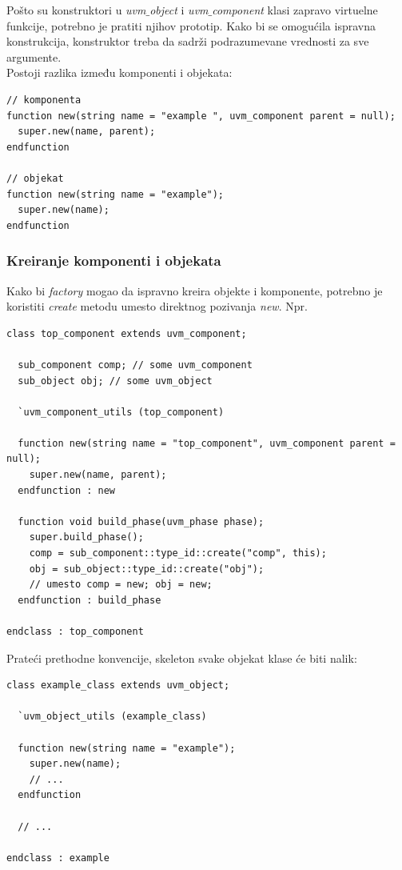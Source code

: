 Pošto su konstruktori u \emph{uvm\(\_\)object} i \emph{uvm\(\_\)component} klasi
zapravo virtuelne funkcije, potrebno je pratiti njihov prototip. Kako bi se
omogućila ispravna konstrukcija, konstruktor treba da sadrži podrazumevane
vrednosti za sve argumente.\\

Postoji razlika između komponenti i objekata:

\begin{lstlisting}
// komponenta
function new(string name = "example ", uvm_component parent = null);
  super.new(name, parent);
endfunction

// objekat
function new(string name = "example");
  super.new(name);
endfunction
\end{lstlisting}

\subsubsection{Kreiranje komponenti i objekata}

Kako bi \emph{factory} mogao da ispravno kreira objekte i komponente, potrebno
je koristiti \emph{create} metodu umesto direktnog pozivanja \emph{new}. Npr.

\begin{lstlisting}
class top_component extends uvm_component;

  sub_component comp; // some uvm_component
  sub_object obj; // some uvm_object

  `uvm_component_utils (top_component)

  function new(string name = "top_component", uvm_component parent = null);
    super.new(name, parent);
  endfunction : new

  function void build_phase(uvm_phase phase);
    super.build_phase();
    comp = sub_component::type_id::create("comp", this);
    obj = sub_object::type_id::create("obj");
    // umesto comp = new; obj = new;
  endfunction : build_phase

endclass : top_component 
\end{lstlisting}

Prateći prethodne konvencije, skeleton svake objekat klase će biti nalik:

\begin{lstlisting}
class example_class extends uvm_object;

  `uvm_object_utils (example_class)

  function new(string name = "example");
    super.new(name);
    // ...
  endfunction

  // ...

endclass : example
\end{lstlisting}

